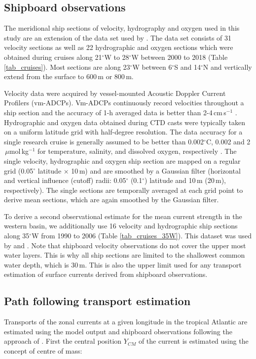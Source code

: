 \documentclass[os, manuscript]{copernicus}
\begin{document}
	\subsection{Shipboard observations}
	The meridional ship sections of velocity, hydrography and oxygen used in this study are an extension of the data set used by \citet{Burmeister2020}. The data set consists of 31 velocity sections as well as 22 hydrographic and oxygen sections which were obtained during cruises along 21$^{\circ}$W to 28$^{\circ}$W between 2000 to 2018 (Table \ref{tab_cruises}). Most sections are along 23$^{\circ}$W between 6$^{\circ}$S and 14$^{\circ}$N and vertically extend from the surface to 600$ \, $m or 800$ \, $m.
	
	Velocity data were acquired by vessel-mounted Acoustic Doppler Current Profilers (vm-ADCPs). Vm-ADCPs continuously record velocities throughout a ship section and the accuracy of 1-h averaged data is better than 2-4$ \, $cm$ \, $s$ ^{-1} $ \citep{Fischer2003}. Hydrographic and oxygen data obtained during CTD casts were typically taken on a uniform latitude grid with half-degree resolution. The data accuracy for a single research cruise is generally assumed to be better than 0.002$ ^{\circ} $C, 0.002 and 2$ \,\mu $mol$ \, $kg$ ^{-1} $ for temperature, salinity, and dissolved oxygen, respectively \citep{Hahn2017}. The single velocity, hydrographic and oxygen ship section are mapped on a regular grid (0.05$ ^{\circ} $ latitude $ \times $ 10$ \, $m) and are smoothed by a Gaussian filter (horizontal and vertical influence (cutoff) radii: 0.05$ ^{\circ} $ (0.1$ ^{\circ} $) latitude and 10$ \, $m (20$ \, $m), respectively). The single sections are temporally averaged at each grid point to derive mean sections, which are again smoothed by the Gaussian filter. 
	
	To derive a second observational estimate for the mean current strength in the western basin, we additionally use 16 velocity and hydrographic ship sections along 35$^{\circ}$W from 1990 to 2006 (Table \ref{tab_cruises_35W}). This dataset was used by \cite{Hormann2007} and \cite{Tuchen2022}. Note that shipboard velocity observations do not cover the upper most water layers. This is why all ship sections are limited to the shallowest common water depth, which is 30$\,$m. This is also the upper limit used for any transport estimation of surface currents derived from shipboard observations.
	
	\subsection{Path following transport estimation}
	Transports of the zonal currents at a given longitude in the tropical Atlantic are estimated using the model output and shipboard observations following the approach of \citet{Hsin2012}. First the central position $ Y_{CM} $ of the current is estimated using the concept of centre of mass:
	
\end{document}
